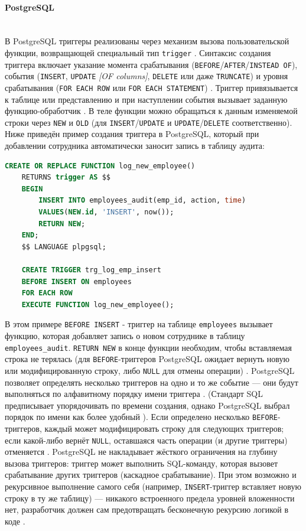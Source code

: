  \paragraph{\textbf{PostgreSQL}} ~\\

 В PostgreSQL триггеры реализованы через механизм вызова пользовательской функции, возвращающей специальный тип \texttt{trigger} \autocite{Postgresqlcom}. Синтаксис создания триггера включает указание момента срабатывания (\texttt{BEFORE}/\texttt{AFTER}/\texttt{INSTEAD OF}), события (\texttt{INSERT}, \texttt{UPDATE} \textit{[OF columns]}, \texttt{DELETE} или даже \texttt{TRUNCATE}) и уровня срабатывания (\texttt{FOR EACH ROW} или \texttt{FOR EACH STATEMENT})  \autocite{Postgresqlcom}. Триггер привязывается к таблице или представлению и при наступлении события вызывает заданную функцию-обработчик \autocite{Postgresqlcom}. В теле функции можно обращаться к данным изменяемой строки через \texttt{NEW} и \texttt{OLD} (для \texttt{INSERT}/\texttt{UPDATE} и \texttt{UPDATE}/\texttt{DELETE} соответственно). Ниже приведён пример создания триггера в PostgreSQL, который при добавлении сотрудника автоматически заносит запись в таблицу аудита:
 \begin{lstlisting}[language=SQL]
    CREATE OR REPLACE FUNCTION log_new_employee()
    RETURNS trigger AS $$
    BEGIN
        INSERT INTO employees_audit(emp_id, action, time)
        VALUES(NEW.id, 'INSERT', now());
        RETURN NEW;
    END;
    $$ LANGUAGE plpgsql;

    CREATE TRIGGER trg_log_emp_insert
    BEFORE INSERT ON employees
    FOR EACH ROW
    EXECUTE FUNCTION log_new_employee();
 \end{lstlisting}

 В этом примере \texttt{BEFORE INSERT} - триггер на таблице \texttt{employees} вызывает функцию, которая добавляет запись о новом сотруднике в таблицу \texttt{employees\_audit}. \texttt{RETURN NEW} в конце функции необходим, чтобы вставляемая строка не терялась (для \texttt{BEFORE}-триггеров PostgreSQL ожидает вернуть новую или модифицированную строку, либо \texttt{NULL} для отмены операции)  \autocite{Postgresqltrig}. PostgreSQL позволяет определять несколько триггеров на одно и то же событие — они будут выполняться по алфавитному порядку имени триггера \autocite{Postgresqlcom}. (Стандарт SQL предписывает упорядочивать по времени создания, однако PostgreSQL выбрал порядок по имени как более удобный \autocite{Postgresqlcom}). Если определено несколько \texttt{BEFORE}-триггеров, каждый может модифицировать строку для следующих триггеров; если какой-либо вернёт \texttt{NULL}, оставшаяся часть операции (и другие триггеры) отменяется \autocite{Postgresqltrig}. PostgreSQL не накладывает жёсткого ограничения на глубину вызова триггеров: триггер может выполнить SQL-команду, которая вызовет срабатывание других триггеров (каскадное срабатывание). При этом возможно и рекурсивное выполнение самого себя (например, \texttt{INSERT}-триггер вставляет новую строку в ту же таблицу) — никакого встроенного предела уровней вложенности нет, разработчик должен сам предотвращать бесконечную рекурсию логикой в коде \autocite{Postgresqltrig}. 
 
